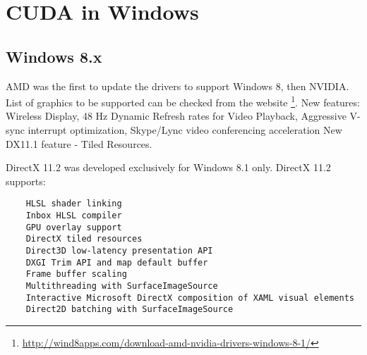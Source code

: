 \chapter{CUDA in Windows}

\section{Windows 8.x}

AMD was the first to update the drivers to support Windows 8, then NVIDIA.
List of graphics to be supported can be checked from the website
\footnote{\url{http://wind8apps.com/download-amd-nvidia-drivers-windows-8-1/}}.
New features: Wireless Display, 48 Hz Dynamic Refresh rates for Video Playback,
Aggressive V-sync  interrupt optimization, Skype/Lync video conferencing
acceleration New DX11.1 feature - Tiled Resources.


DirectX 11.2 was developed exclusively for Windows 8.1 only. DirectX 11.2
supports: 
\begin{verbatim}
    HLSL shader linking
    Inbox HLSL compiler
    GPU overlay support
    DirectX tiled resources
    Direct3D low-latency presentation API
    DXGI Trim API and map default buffer
    Frame buffer scaling
    Multithreading with SurfaceImageSource
    Interactive Microsoft DirectX composition of XAML visual elements
    Direct2D batching with SurfaceImageSource
\end{verbatim}

